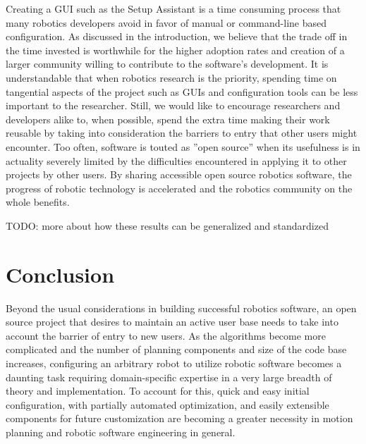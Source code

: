 \documentclass[10pt,journal,compsoc]{joser1}
\begin{document}
{Creating a GUI such as the Setup Assistant is a time consuming process that many robotics developers avoid in favor of manual or command-line based configuration. As discussed in the introduction, we believe that the trade off in the time invested is worthwhile for the higher adoption rates and creation of a larger community willing to contribute to the software's development. It is understandable that when robotics research is the priority, spending time on tangential aspects of the project such as GUIs and configuration tools can be less important to the researcher. Still, we would like to encourage researchers and developers alike to, when possible, spend the extra time making their work reusable by taking into consideration the barriers to entry that other users might encounter. Too often, software is touted as ''open source'' when its usefulness is in actuality severely limited by the difficulties encountered in applying it to other projects by other users. By sharing accessible open source robotics 
software, the progress of robotic technology is accelerated and the robotics community on the whole benefits.

TODO: more about how these results can be generalized and standardized

\section{Conclusion}
\label{sec::conclusion}

Beyond the usual considerations in building successful robotics software, an open source project that desires to maintain an active user base needs to take into account the barrier of entry to new users. As the algorithms become more complicated and the number of planning components and size of the code base increases, configuring an arbitrary robot to utilize robotic software becomes a daunting task requiring domain-specific expertise in a very large breadth of theory and implementation. To account for this, quick and easy initial configuration, with partially automated optimization, and easily extensible components for future customization are becoming a greater necessity in motion planning and robotic software engineering in general. 

}
\end{document}
